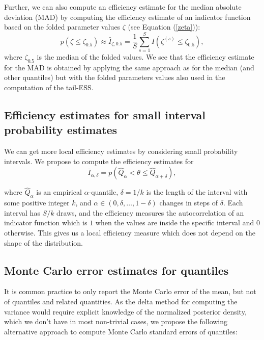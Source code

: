 \documentclass[american,]{article}
\begin{document}
Further, we can also compute an efficiency estimate for the median
absolute deviation (MAD) by computing the efficiency estimate of an
indicator function based on the folded parameter values \(\zeta\) (see
Equation (\ref{zeta})):
\begin{equation}
p(\zeta \leq \zeta_{0.5}) \approx \bar{I}_{\zeta,0.5} = \frac{1}{S}\sum_{s=1}^S
I(\zeta^{(s)} \leq \zeta_{0.5}),
\end{equation}
where \(\zeta_{0.5}\) is the median of the folded values. We see that
the efficiency estimate for the MAD is obtained by applying the same
approach as for the median (and other quantiles) but with the folded
parameters values also used in the computation of the tail-ESS.

\hypertarget{small_interval_S_eff}{%
\subsection{Efficiency estimates for small interval probability
estimates}\label{small_interval_S_eff}}

We can get more local efficiency estimates by considering small
probability intervals. We propose to compute the efficiency estimates
for
\begin{equation}
\bar{I}_{\alpha,\delta} = p(\hat{Q}_\alpha < \theta \leq \hat{Q}_{\alpha+\delta}),
\end{equation}

where \(\hat{Q}_\alpha\) is an empirical \(\alpha\)-quantile,
\(\delta=1/k\) is the length of the interval with some positive integer
\(k\), and \(\alpha \in (0,\delta,\ldots,1-\delta)\) changes in steps of
\(\delta\). Each interval has \(S/k\) draws, and the efficiency measures
the autocorrelation of an indicator function which is \(1\) when the
values are inside the specific interval and \(0\) otherwise. This gives
us a local efficiency measure which does not depend on the shape of the
distribution.

\hypertarget{mcse}{%
\subsection{Monte Carlo error estimates for quantiles}\label{mcse}}

It is common practice to only report the Monte Carlo error of the mean,
but not of quantiles and related quantities. As the delta method for
computing the variance would require explicit knowledge of the
normalized posterior density, which we don't have in most non-trivial
cases, we propose the following alternative approach to compute Monte
Carlo standard errors of quantiles:
\end{document}
